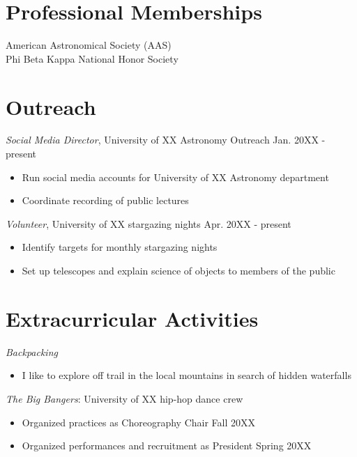 \documentclass[resmargin, 10pt]{res} %
\begin{document}
\begin{resume}
\begin{itemize}
\end{itemize}

\section{Professional Memberships}
American Astronomical Society (AAS) \\
Phi Beta Kappa National Honor Society \\

\section{Outreach}

{\sl Social Media Director}, University of XX Astronomy Outreach \hfill Jan. 20XX - present
\vspace{1mm}
\begin{itemize} \itemsep -2pt
\item Run social media accounts for University of XX Astronomy department
\item Coordinate recording of public lectures
\end{itemize}

{\sl Volunteer}, University of XX stargazing nights \hfill Apr. 20XX - present
\vspace{1mm}
\begin{itemize} \itemsep -2pt
\item Identify targets for monthly stargazing nights
\item Set up telescopes and explain science of objects to members of the public
\end{itemize}

\section{Extracurricular Activities}
{\sl Backpacking}
\vspace{1mm}
\begin{itemize} \itemsep -2pt
\item I like to explore off trail in the local mountains in search of hidden waterfalls
\end{itemize}

{\sl The Big Bangers}: University of XX hip-hop dance crew
\vspace{1mm}
\begin{itemize} \itemsep -2pt
\item Organized practices as Choreography Chair \hfill Fall 20XX
\item Organized performances and recruitment as President \hfill Spring 20XX
\end{itemize}


\end{resume}
\end{document}

